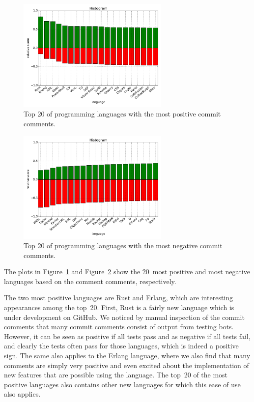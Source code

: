 \documentclass{article}
\begin{document}
\begin{figure}[hb!]
  \centering
  \includegraphics[width=0.66\textwidth]{Images/Positive_languages_passive_aggressive.pdf}
  \caption{Top 20 of programming languages with the most positive commit comments.}\label{fig:language-pos}
\end{figure}

\begin{figure}[ht!]
  \centering
  \includegraphics[width=0.66\textwidth]{Images/Negative_languages_passive_aggressive.pdf}
  \caption{Top 20 of programming languages with the most negative commit 
  comments.}\label{fig:language-neg}
\end{figure}

The plots in Figure~\ref{fig:language-pos} and Figure~\ref{fig:language-neg} 
show the 20~most positive and most negative languages based on the comment
comments, respectively.

The two most positive languages are Rust and Erlang, which are interesting 
appearances among the top~20. First, Rust is a fairly new language which is 
under development on GitHub. We noticed by manual inspection
of the commit comments that many commit comments consist of output from testing 
bots. However, it can be seen as positive if all tests pass and as negative if 
all tests fail, and clearly the tests often pass for those languages, which is 
indeed a positive sign. The same also applies to the Erlang language, where we 
also find that many comments are simply very positive and even excited about 
the implementation of new features that are possible using the language. The 
top~20 of the most positive languages also contains other new languages for 
which this ease of use also applies.
\end{document}
